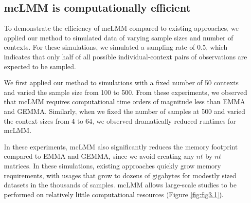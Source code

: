     \subsection{mcLMM is computationally efficient}
        To demonstrate the efficiency of mcLMM compared to existing approaches, we applied our method to simulated data of varying sample sizes and number of contexts. For these simulations, we simulated a sampling rate of 0.5, which indicates that only half of all possible individual-context pairs of observations are expected to be sampled. 
        
        We first applied our method to simulations with a fixed number of 50 contexts and varied the sample size from 100 to 500. From these experiments, we observed that mcLMM requires computational time orders of magnitude less than EMMA and GEMMA. Similarly, when we fixed the number of samples at 500 and varied the context sizes from 4 to 64, we observed dramatically reduced runtimes for mcLMM.
        
        In these experiments, mcLMM also significantly reduces the memory footprint compared to EMMA and GEMMA, since we avoid creating any $nt$ by $nt$ matrices. In these simulations, existing approaches quickly grow memory requirements, with usages that grow to dozens of gigabytes for modestly sized datasets in the thousands of samples. mcLMM allows large-scale studies to be performed on relatively little computational resources (Figure \ref{fig:fig3.1}). 
        
